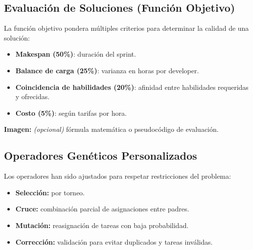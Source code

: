 



\subsection{Evaluación de Soluciones (Función Objetivo)}

La función objetivo pondera múltiples criterios para determinar la calidad de una solución:

\begin{itemize}
    \item \textbf{Makespan (50\%)}: duración del sprint.
    \item \textbf{Balance de carga (25\%)}: varianza en horas por developer.
    \item \textbf{Coincidencia de habilidades (20\%)}: afinidad entre habilidades requeridas y ofrecidas.
    \item \textbf{Costo (5\%)}: según tarifas por hora.
\end{itemize}

\noindent\textbf{Imagen:} \textit{(opcional)} fórmula matemática o pseudocódigo de evaluación.

\subsection{Operadores Genéticos Personalizados}

Los operadores han sido ajustados para respetar restricciones del problema:

\begin{itemize}
    \item \textbf{Selección:} por torneo.
    \item \textbf{Cruce:} combinación parcial de asignaciones entre padres.
    \item \textbf{Mutación:} reasignación de tareas con baja probabilidad.
    \item \textbf{Corrección:} validación para evitar duplicados y tareas inválidas.
\end{itemize}

